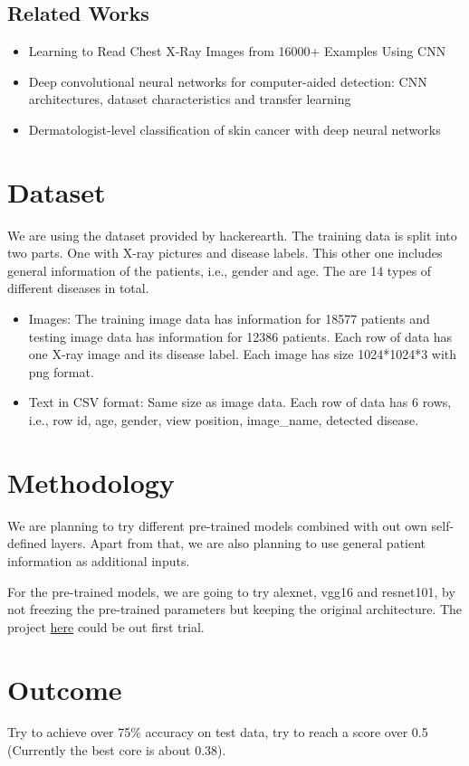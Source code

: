 \documentclass[10pt,twocolumn,letterpaper]{article}
\begin{document}
    \subsection{Related Works}
        \begin{itemize}
            \item Learning to Read Chest X-Ray Images from 16000+ Examples Using CNN \cite{dong2017learning}
             \item Deep convolutional neural networks for computer-aided detection: CNN architectures, dataset characteristics and transfer learning \cite{shin2016deep}
              \item Dermatologist-level classification of skin cancer with deep neural networks
              \cite{esteva2017dermatologist}
        \end{itemize}

\section{Dataset}
We are using the dataset provided by hackerearth. The training data is split into two parts. One with X-ray pictures and disease labels. This other one includes general information of the patients, i.e., gender and age. The are 14 types of different diseases in total.

\begin{itemize}
	\item Images:  The training image data has information for 18577 patients and testing image data has information for 12386 patients. Each row of data has one X-ray image and its disease label. Each image has size 1024*1024*3 with png format.
	\item Text in CSV format: Same size as image data. Each row of data has 6 rows, i.e., row id, age, gender, view position, image\_name, detected disease.
\end{itemize}

\section{Methodology}
We are planning to try different pre-trained models combined with out own self-defined layers. Apart from that, we are also planning to use general patient information as additional inputs.

For the pre-trained models, we are going to try alexnet, vgg16 and resnet101, by not freezing the pre-trained parameters but keeping the original architecture. The project \href{https://github.com/ayush1997/Xvision}{here} could be out first trial.

\section{Outcome}
    Try to achieve over 75\% accuracy on test data, try to reach a score over 0.5 (Currently the best core is about 0.38).

{\small


}
\end{document}

